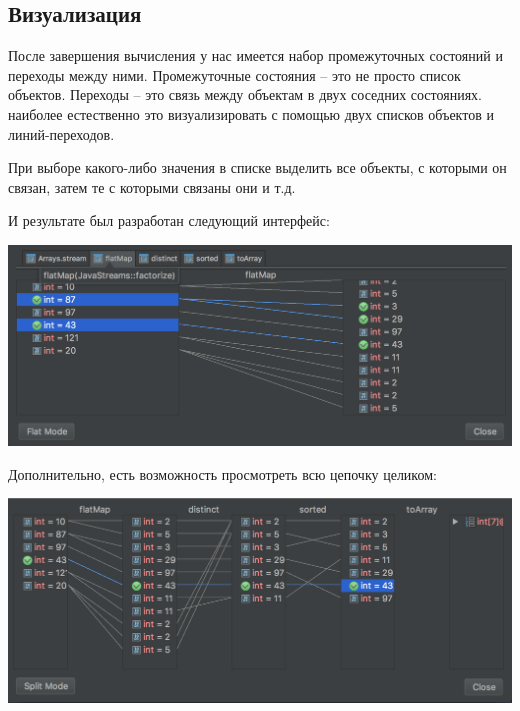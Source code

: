 \subsection{Визуализация}
После завершения вычисления у нас имеется набор промежуточных состояний и переходы между ними. Промежуточные состояния -- это не просто список объектов. Переходы -- это связь между объектам в двух соседних состояниях. наиболее естественно это визуализировать с помощью двух списков объектов и линий-переходов.

При выборе какого-либо значения в списке выделить все объекты, с которыми он связан, затем те с которыми связаны они и т.д. 

И результате был разработан следующий интерфейс:

\includegraphics[scale=0.3]{chapter3/img/split-view.png}

Дополнительно, есть возможность просмотреть всю цепочку целиком:

\includegraphics[scale=0.4]{chapter3/img/flat-view.png}










